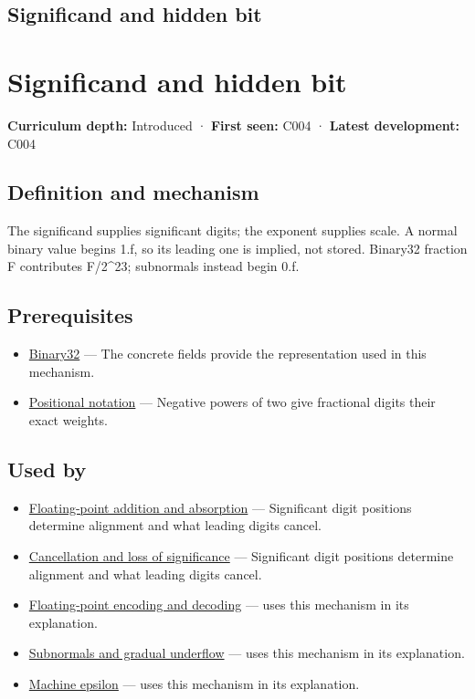 \hypertarget{appendix-a24fd710cf67}{}
\section*{Significand and hidden bit}
\chapter{Significand and hidden bit}\label{appendix-a24fd710cf67-significand-and-hidden-bit}

\textbf{Curriculum depth:} Introduced · \textbf{First seen:} C004 · \textbf{Latest development:} C004

\section{Definition and mechanism}\label{appendix-a24fd710cf67-definition-and-mechanism}

The significand supplies significant digits; the exponent supplies scale. A normal binary value begins 1.f, so its leading one is implied, not stored. Binary32 fraction F contributes F/2\^{}23; subnormals instead begin 0.f.

\section{Prerequisites}\label{appendix-a24fd710cf67-prerequisites}

\begin{itemize}
\tightlist
\item
  \hyperref[appendix-5057f9ad327f]{Binary32} --- The concrete fields provide the representation used in this mechanism.
\item
  \hyperref[appendix-83c3f28f7bda]{Positional notation} --- Negative powers of two give fractional digits their exact weights.
\end{itemize}

\section{Used by}\label{appendix-a24fd710cf67-used-by}

\begin{itemize}
\item
  \hyperref[appendix-a1b1b4580dfd]{Floating-point addition and absorption} --- Significant digit positions determine alignment and what leading digits cancel.
\item
  \hyperref[appendix-a2773a6a2f9d]{Cancellation and loss of significance} --- Significant digit positions determine alignment and what leading digits cancel.
\item
  \hyperref[appendix-6854d0e2218e]{Floating-point encoding and decoding} --- uses this mechanism in its explanation.
\item
  \hyperref[appendix-00a6e044c437]{Subnormals and gradual underflow} --- uses this mechanism in its explanation.
\item
  \hyperref[appendix-390ea641da54]{Machine epsilon} --- uses this mechanism in its explanation.
\end{itemize}

